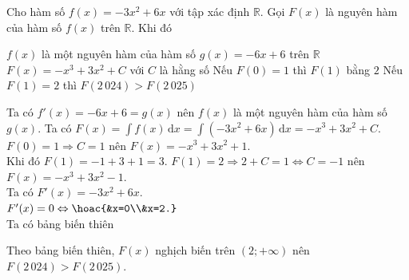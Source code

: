 \documentclass[12pt,aspectratio=169]{beamer}
\begin{document}
\begin{dungsai}[n]%
	Cho hàm số $f(x)=-3x^2+6x$ với tập xác định $\mathbb{R}$. Gọi $F(x)$ là nguyên hàm của hàm số $f(x)$ trên $\mathbb{R}$. Khi đó

	\choiceTF
		{\True $f(x)$ là một nguyên hàm của hàm số $g(x)=-6x+6$ trên $\mathbb{R}$}
		{\True $F(x)=-x^3+3x^2+C$ với $C$ là hằng số}
		{Nếu $F(0)=1$ thì $F(1)$ bằng $2$}
		{\True Nếu $F(1)=2$ thì $F(2\,024) > F(2\,025)$}

	\begin{loigiai}
			\begin{itemchoice}
				\itemch
				Ta có $f'(x)=-6x+6=g(x)$ nên $f(x)$ là một nguyên hàm của hàm số $g(x)$.
				\itemch Ta có $F(x)=\displaystyle\int f(x) \mathrm{\,d}x=\displaystyle\int (-3x^2+6x) \mathrm{\,d}x=-x^3+3x^2+C$.
				\itemch $F(0)=1\Rightarrow C=1$ nên $F(x)=-x^3+3x^2+1$.\\
				Khi đó $F(1)=-1+3+1=3$.
				\itemch
				$F(1)=2\Rightarrow 2+C=1\Leftrightarrow C=-1$ nên $F(x)=-x^3+3x^2-1$.\\
				Ta có $F'(x)=-3x^2+6x$.\\
				$F'(x)=0\Leftrightarrow \hoac {&x=0\\&x=2.}$\\
				Ta có bảng biến thiên
				\begin{center}
			\end{center}
			Theo bảng biến thiên, $F(x)$ nghịch biến trên $(2;+\infty)$ nên $F(2\,024) > F(2\,025)$.
		\end{itemchoice}
	\end{loigiai}
\end{dungsai}
\end{document}
